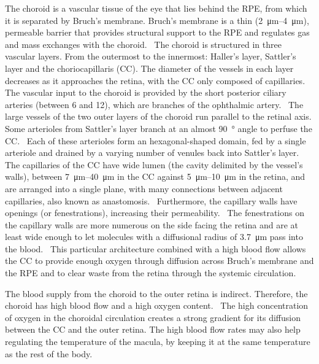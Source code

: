 \documentclass[12pt,a4paper]{journal}
\begin{document}
The choroid is a vascular tissue of the eye that lies behind the RPE, from which it is separated by Bruch's membrane.
Bruch's membrane is a thin (\SIrange{2}{4}{\micro\meter}), permeable barrier that provides structural support to the RPE and regulates gas and mass exchanges with the choroid.~\cite{Curcio_2013}
The choroid is structured in three vascular layers.
From the outermost to the innermost: Haller's layer, Sattler's layer and the choriocapillaris (CC).
The diameter of the vessels in each layer decreases as it approaches the retina, with the CC only composed of capillaries.
The vascular input to the choroid is provided by the short posterior ciliary arteries (between 6 and 12), which are branches of the ophthalmic artery.~\cite{Kiel_2010}
The large vessels of the two outer layers of the choroid run parallel to the retinal axis.
Some arterioles from Sattler's layer branch at an almost \SI{90}{\degree} angle to perfuse the CC.~\cite{Nickla_2010}
Each of these arterioles form an hexagonal-shaped domain, fed by a single arteriole and drained by a varying number of venules back into Sattler's layer.~\cite{Zouache_2016}
The capillaries of the CC have wide lumen (the cavity delimited by the vessel's walls), between \SIrange{7}{40}{\micro\meter} in the CC against \SIrange{5}{10}{\micro\meter} in the retina, and are arranged into a single plane, with many connections between adjacent capillaries, also known as anastomosis.~\cite{Bill_1983, ChanLing_2011,Fryczkowski_1994}
Furthermore, the capillary walls have openings (or fenestrations), increasing their permeability.~\cite{Nickla_2010}
The fenestrations on the capillary walls are more numerous on the side facing the retina and are at least wide enough to let molecules with a diffusional radius of \SI{3.7}{\micro\meter} pass into the blood.~\cite{Nickla_2010, Bill_1983}
This particular architecture combined with a high blood flow allows the CC to provide enough oxygen through diffusion across Bruch's membrane and the RPE and to clear waste from the retina through the systemic circulation.

The blood supply from the choroid to the outer retina is indirect.
Therefore, the choroid has high blood flow and a high oxygen content.~\cite{Bill_1983}
The high concentration of oxygen in the choroidal circulation creates a strong gradient for its diffusion between the CC and the outer retina.
The high blood flow rates may also help regulating the temperature of the macula, by keeping it at the same temperature as the rest of the body.~\cite{Bill_1983, Parver_1991}
\end{document}
